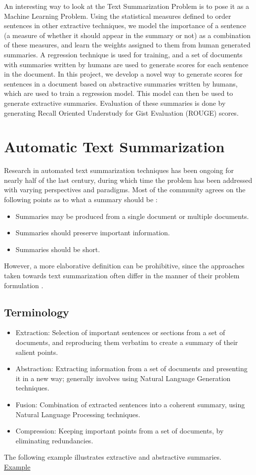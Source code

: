 \documentclass[BTech]{nitgoathesis}
\begin{document}
An interesting way to look at the Text Summarization Problem is to pose it as a Machine Learning Problem. Using the statistical measures defined to order sentences in other extractive techniques, we model the importance of a sentence (a measure of whether it should appear in the summary or not) as a combination of these measures, and learn the weights assigned to them from human generated summaries. A regression technique is used for training, and a set of documents with summaries written by humans are used to generate scores for each sentence in the document.  In this project, we develop a novel way to generate scores for sentences in a document based on abstractive summaries written by humans, which are used to train a regression model. This model can then be used to generate extractive summaries. Evaluation of these summaries is done by generating Recall Oriented Understudy for Gist Evaluation (ROUGE) scores.
\chapter{Automatic Text Summarization}
Research in automated text summarization techniques has been ongoing for nearly half of the last century, during which time the problem has been addressed with varying perspectives and paradigms. Most of the community agrees on the following points as to what a summary should be \cite{survey}:
\begin{itemize}
\item Summaries may be produced from a single document or multiple documents.
\item Summaries should preserve important information.
\item Summaries should be short.


\end{itemize}
However, a more elaborative definition can be prohibitive, since the approaches taken towards text summarization often differ in the manner of their problem formulation \cite{survey}. 
\section{Terminology}
\begin{itemize}


\item Extraction: Selection of important sentences or sections from a set of documents, and reproducing them verbatim to create a summary of their salient points.
\item Abstraction: Extracting information from a set of documents and presenting it in a new way; generally involves using Natural Language Generation techniques.
\item Fusion: Combination of extracted sentences into a coherent summary, using Natural Language Processing techniques.
\item Compression: Keeping important points from a set of documents, by eliminating redundancies. \cite{meadsystem}
\end{itemize}
The following example illustrates extractive and abstractive summaries.\\
\newpage
{\noindent \large \underline{Example}} 
\end{document}
